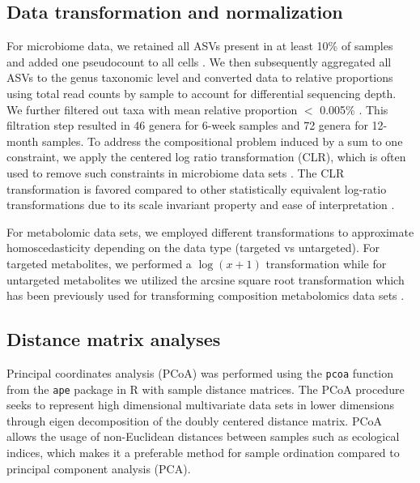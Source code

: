 \subsection{Data transformation and normalization}

For microbiome data, we retained all ASVs present in at least 10\% of samples \cite{mallick2019predictive} and added one pseudocount to all cells \cite{kurtz2015sparse}. We then subsequently aggregated all ASVs to the genus taxonomic level \cite{zhou2019review} and converted data to relative proportions using total read counts by sample to account for differential sequencing depth. We further filtered out taxa with mean relative proportion $<$ 0.005\% \cite{bokulich2013qualityfiltering}. This filtration step resulted in 46 genera for 6-week samples and 72 genera for 12-month samples. To address the compositional problem induced by a sum to one constraint, we apply the centered log ratio transformation (CLR), which is often used to remove such constraints in microbiome data sets \cite{aitchison1982statistical}. The CLR transformation is favored compared to other statistically equivalent log-ratio transformations due to its scale invariant property and ease of interpretation \cite{gloor2017microbiome}. 

For metabolomic data sets, we employed different transformations to approximate homoscedasticity depending on the data type (targeted vs untargeted). For targeted metabolites, we performed a $\log(x+1)$ transformation while for untargeted metabolites we utilized the arcsine square root transformation which has been previously used for transforming composition metabolomics data sets \cite{mallick2019predictive}.     

\subsection{Distance matrix analyses} 

Principal coordinates analysis (PCoA) was performed using the \texttt{pcoa} function from the \texttt{ape} package in R \cite{paradis2018ape} with sample distance matrices. The PCoA procedure seeks to represent high dimensional multivariate data sets in lower dimensions through eigen decomposition of the doubly centered distance matrix. PCoA allows the usage of non-Euclidean distances between samples such as ecological indices, which makes it a preferable method for sample ordination compared to principal component analysis (PCA). 

